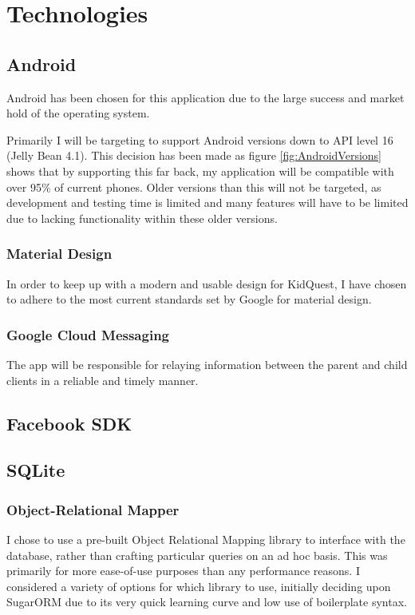 \chapter{Technologies}

\section{Android}
Android has been chosen for this application due to the large success and market hold of the operating system.

Primarily I will be targeting to support Android versions down to API level 16 (Jelly Bean 4.1).
This decision has been made as figure \ref{fig:AndroidVersions} shows that by supporting this far back, my application will be compatible with over 95\% of current phones. 
Older versions than this will not be targeted, as development and testing time is limited and many features will have to be limited due to lacking functionality within these older versions.

\subsection{Material Design}
In order to keep up with a modern and usable design for KidQuest, I have chosen to adhere to the most current standards set by Google for material design.

\subsection{Google Cloud Messaging}
The app will be responsible for relaying information between the parent and child clients in a reliable and timely manner.


\section{Facebook SDK}

\section{SQLite}

\subsection{Object-Relational Mapper}
I chose to use a pre-built Object Relational Mapping library to interface with the database, rather than crafting particular queries on an ad hoc basis.
This was primarily for more ease-of-use purposes than any performance reasons. 
I considered a variety of options for which library to use, initially deciding upon SugarORM due to its very quick learning curve and low use of boilerplate syntax. 

